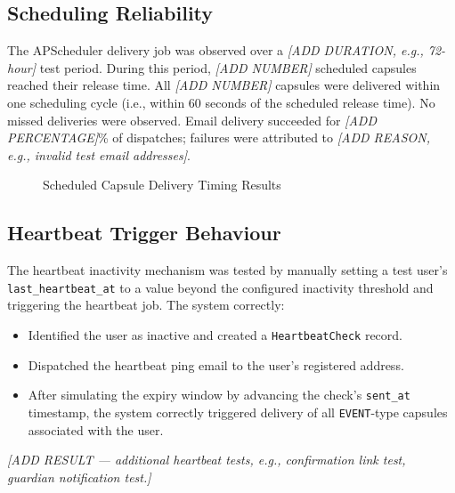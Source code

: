 \documentclass[12pt, a4paper]{article}
\begin{document}
\subsection{Scheduling Reliability}

The APScheduler delivery job was observed over a \textit{[ADD DURATION, e.g., 72-hour]} test period. During this period, \textit{[ADD NUMBER]} scheduled capsules reached their release time. All \textit{[ADD NUMBER]} capsules were delivered within one scheduling cycle (i.e., within 60 seconds of the scheduled release time). No missed deliveries were observed. Email delivery succeeded for \textit{[ADD PERCENTAGE]}\% of dispatches; failures were attributed to \textit{[ADD REASON, e.g., invalid test email addresses]}.

\begin{figure}[H]
  \centering
  \caption{Scheduled Capsule Delivery Timing Results}
  \label{fig:delivery_results}
\end{figure}

\subsection{Heartbeat Trigger Behaviour}

The heartbeat inactivity mechanism was tested by manually setting a test user's \texttt{last\_heartbeat\_at} to a value beyond the configured inactivity threshold and triggering the heartbeat job. The system correctly:

\begin{itemize}
  \item Identified the user as inactive and created a \texttt{HeartbeatCheck} record.
  \item Dispatched the heartbeat ping email to the user's registered address.
  \item After simulating the expiry window by advancing the check's \texttt{sent\_at} timestamp, the system correctly triggered delivery of all \texttt{EVENT}-type capsules associated with the user.
\end{itemize}

\textit{[ADD RESULT — additional heartbeat tests, e.g., confirmation link test, guardian notification test.]}
\end{document}

